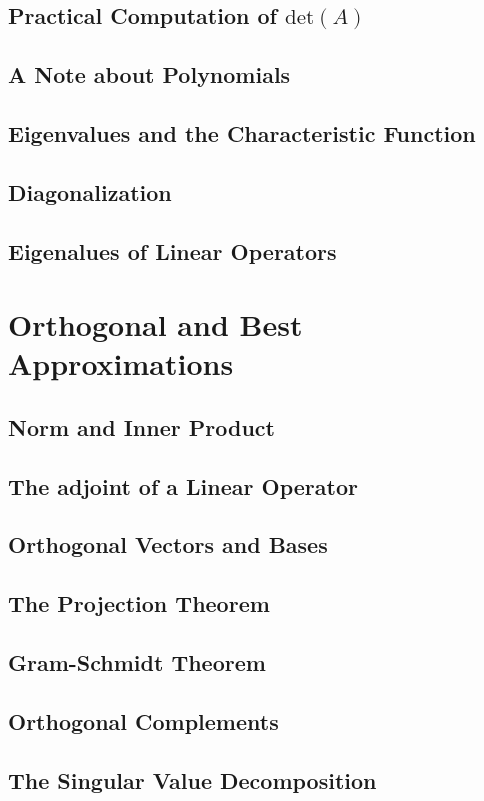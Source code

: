 \documentclass{book}
\theoremstyle{definition}
\theoremstyle{remark}
\begin{document}
\subsection{Practical Computation of $\text{det}(A)$}
\subsection{A Note about Polynomials}
\subsection{Eigenvalues and the Characteristic Function}
\subsection{Diagonalization}
\subsection{Eigenalues of Linear Operators}

\section{Orthogonal and Best Approximations}
\subsection{Norm and Inner Product}
\subsection{The adjoint of a Linear Operator}
\subsection{Orthogonal Vectors and Bases}
\subsection{The Projection Theorem}
\subsection{Gram-Schmidt Theorem}
\subsection{Orthogonal Complements}

\subsection{The Singular Value Decomposition}
\end{document}
